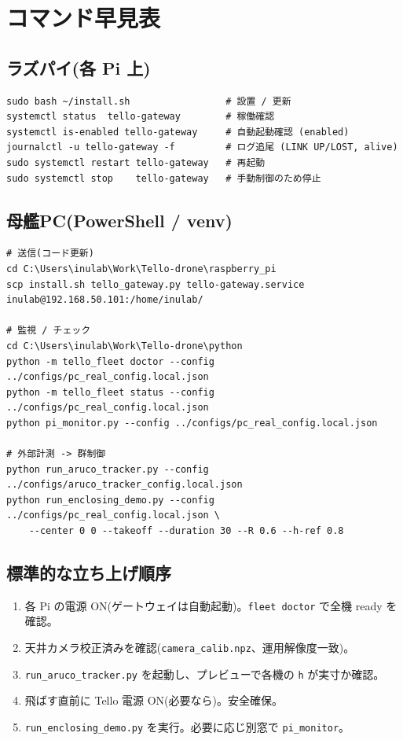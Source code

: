 \documentclass[11pt,a4paper]{ltjsarticle}
\newcommand{\code}[1]{\texttt{\small #1}}
\begin{document}
\section{コマンド早見表}

\subsection{ラズパイ(各 Pi 上)}
\begin{lstlisting}
sudo bash ~/install.sh                 # 設置 / 更新
systemctl status  tello-gateway        # 稼働確認
systemctl is-enabled tello-gateway     # 自動起動確認 (enabled)
journalctl -u tello-gateway -f         # ログ追尾 (LINK UP/LOST, alive)
sudo systemctl restart tello-gateway   # 再起動
sudo systemctl stop    tello-gateway   # 手動制御のため停止
\end{lstlisting}

\subsection{母艦PC(PowerShell / venv)}
\begin{lstlisting}
# 送信(コード更新)
cd C:\Users\inulab\Work\Tello-drone\raspberry_pi
scp install.sh tello_gateway.py tello-gateway.service inulab@192.168.50.101:/home/inulab/

# 監視 / チェック
cd C:\Users\inulab\Work\Tello-drone\python
python -m tello_fleet doctor --config ../configs/pc_real_config.local.json
python -m tello_fleet status --config ../configs/pc_real_config.local.json
python pi_monitor.py --config ../configs/pc_real_config.local.json

# 外部計測 -> 群制御
python run_aruco_tracker.py --config ../configs/aruco_tracker_config.local.json
python run_enclosing_demo.py --config ../configs/pc_real_config.local.json \
    --center 0 0 --takeoff --duration 30 --R 0.6 --h-ref 0.8
\end{lstlisting}

\subsection{標準的な立ち上げ順序}
\begin{enumerate}[leftmargin=1.6em]
  \item 各 Pi の電源 ON(ゲートウェイは自動起動)。\code{fleet doctor} で全機 ready を確認。
  \item 天井カメラ校正済みを確認(\code{camera\_calib.npz}、運用解像度一致)。
  \item \code{run\_aruco\_tracker.py} を起動し、プレビューで各機の \code{h} が実寸か確認。
  \item 飛ばす直前に Tello 電源 ON(必要なら)。安全確保。
  \item \code{run\_enclosing\_demo.py} を実行。必要に応じ別窓で \code{pi\_monitor}。
\end{enumerate}
\end{document}
